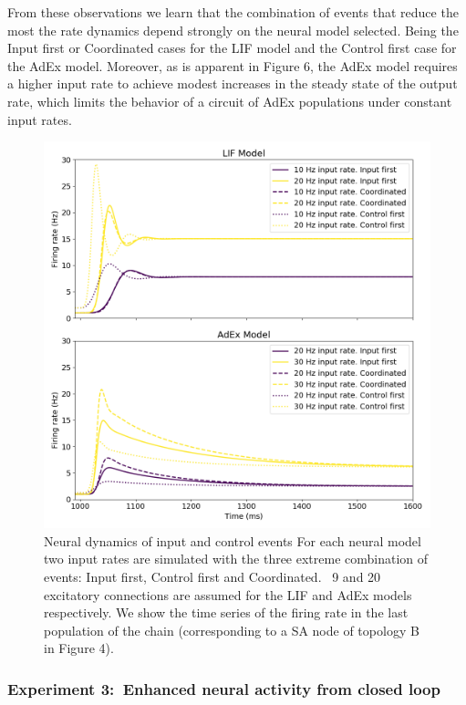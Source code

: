 \documentclass[10pt]{article}
\begin{document}
From these observations we learn that the combination of events that
reduce the most the rate dynamics depend strongly on the neural model
selected. Being the Input first or Coordinated cases for the LIF model
and the Control first case for the AdEx model. Moreover, as is apparent
in Figure 6, the AdEx model requires a higher input rate to achieve
modest increases in the steady state of the output rate, which limits
the behavior of a circuit of AdEx populations under constant input
rates.

\begin{figure}[h!]
\begin{center}
\includegraphics[width=0.70\columnwidth]{figures/experiment2_ctl_plots/experiment2_ctl_plots}
\caption{{Neural dynamics of input and control events
{\label{462003}}
For each neural model two input rates are simulated with the three
extreme combination of events: Input first, Control first and
Coordinated. ~9 and 20 excitatory connections are assumed for the LIF
and AdEx models respectively. We show the time series of the firing rate
in the last population of the chain (corresponding to a SA node of
topology B in Figure 4).
{\label{462003}}%
}}
\end{center}
\end{figure}

\subsubsection{Experiment 3:~Enhanced neural activity from closed
loop}

{\label{758539}}
\end{document}
